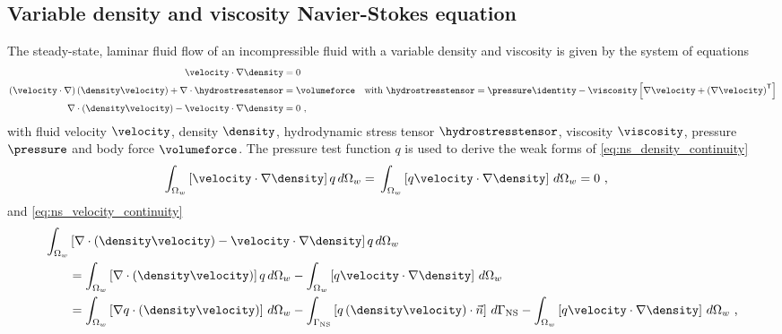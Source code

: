 \subsection{Variable density and viscosity Navier-Stokes equation}
%

The steady-state, laminar fluid flow of an incompressible fluid with a variable density and viscosity is given
by the system of equations~\cite{Axelsson-2015}
%
\begin{align}
  \label{eq:ns_density_continuity}
  \velocity \cdot \nabla \density ={}& 0 \\
  \label{eq:ns_conservation}
  \left( \velocity \cdot \nabla \right) \left( \density\velocity \right)
  + \nabla \cdot \hydrostresstensor ={}& \volumeforce \text{\quad with }
  \hydrostresstensor =
    \pressure\identity - \viscosity\left[\nabla\velocity+\left(\nabla\velocity \right)^\mathsf{T}\right]
  \\
  \label{eq:ns_velocity_continuity}
  \nabla \cdot \left( \density\velocity \right) - \velocity \cdot \nabla \density ={}& 0
  \text { ,}
\end{align}
%
with fluid velocity $\velocity$, density $\density$, hydrodynamic stress tensor $\hydrostresstensor$,
viscosity $\viscosity$, pressure $\pressure$ and body force $\volumeforce$. The pressure test function $q$ is
used to derive the weak forms of \cref{eq:ns_density_continuity}
%
\begin{align}
  \displaystyle\int_{\Omega_w} \left[ \velocity \cdot \nabla \density \right] q \,d\Omega_w ={}&
  \displaystyle\int_{\Omega_w} \left[ q \velocity \cdot \nabla \density \right] \,d\Omega_w = 0 \text{ ,}
\end{align}
%
and \cref{eq:ns_velocity_continuity}
%
\begin{align}
  \displaystyle\int_{\Omega_w}
  &\left[\nabla \cdot \left( \density \velocity \right) - \velocity \cdot \nabla \density \right] q
  \,d\Omega_w \\ & =
  \displaystyle\int_{\Omega_w}
  \left[\nabla \cdot \left( \density \velocity \right) \right] q \,d\Omega_w
  -
  \displaystyle\int_{\Omega_w} 
  \left[ q \velocity \cdot \nabla \density \right] \,d\Omega_w \notag \\
  & =
  \displaystyle\int_{\Omega_w}
  \left[\nabla q \cdot \left( \density \velocity \right) \right] \,d\Omega_w
  -
  \displaystyle\int_{\Gamma_\text{NS}}
  \left[ q \left( \density \velocity \right) \cdot \vec{n} \right] \,d\Gamma_\text{NS}
  -
  \displaystyle\int_{\Omega_w}
  \left[ q \velocity \cdot \nabla \density \right] \,d\Omega_w \notag
  \text{ ,}
\end{align}
